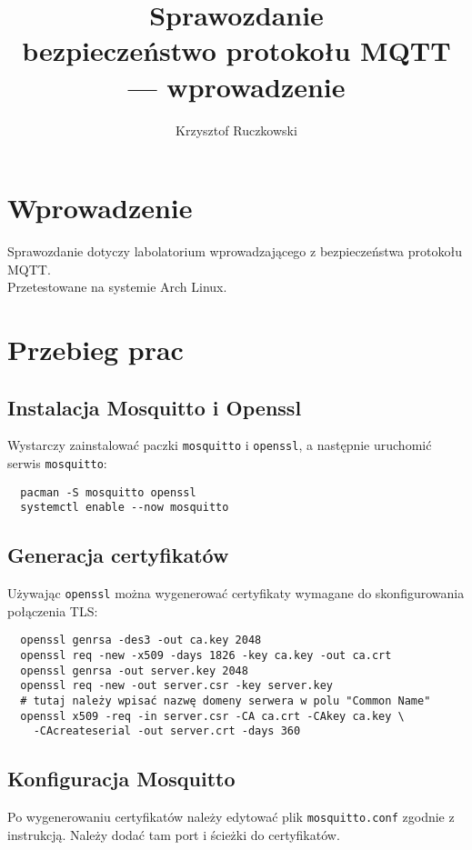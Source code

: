 \documentclass[10pt,a4paper]{article}
\author{Krzysztof Ruczkowski}
\title{Sprawozdanie\\bezpieczeństwo protokołu MQTT --- wprowadzenie}
\begin{document}
\maketitle
\newpage
\tableofcontents
\newpage

\section{Wprowadzenie}

Sprawozdanie dotyczy labolatorium wprowadzającego z bezpieczeństwa protokołu MQTT.
\\
Przetestowane na systemie Arch Linux.

\section{Przebieg prac}

\subsection{Instalacja Mosquitto i Openssl}
Wystarczy zainstalować paczki \texttt{mosquitto} i \texttt{openssl}, a następnie uruchomić serwis \texttt{mosquitto}:

\begin{verbatim}
  pacman -S mosquitto openssl
  systemctl enable --now mosquitto
\end{verbatim}

\subsection{Generacja certyfikatów}
Używając \texttt{openssl} można wygenerować certyfikaty wymagane do skonfigurowania połączenia TLS:

\begin{verbatim}
  openssl genrsa -des3 -out ca.key 2048
  openssl req -new -x509 -days 1826 -key ca.key -out ca.crt
  openssl genrsa -out server.key 2048
  openssl req -new -out server.csr -key server.key
  # tutaj należy wpisać nazwę domeny serwera w polu "Common Name"
  openssl x509 -req -in server.csr -CA ca.crt -CAkey ca.key \
    -CAcreateserial -out server.crt -days 360
\end{verbatim}

\subsection{Konfiguracja Mosquitto}
Po wygenerowaniu certyfikatów należy edytować plik \texttt{mosquitto.conf} zgodnie z instrukcją.
Należy dodać tam port i ścieżki do certyfikatów.
\end{document}
